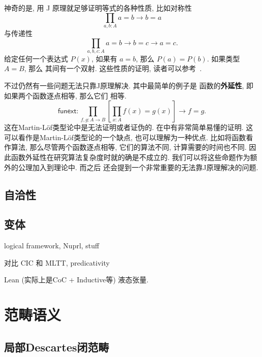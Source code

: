 \documentclass[UTF8]{ctexbook}
\newcommand{\cons}[1]{\textsf{#1}}
\theoremstyle{plain}
\theoremstyle{definition}
\theoremstyle{remark}
\begin{document}
神奇的是, 用 J 原理就足够证明等式的各种性质, 比如对称性
\[\prod_{a,b:A} a = b \to b = a\]
与传递性
\[\prod_{a,b,c:A} a=b \to b=c \to a=c.\]
给定任何一个表达式 \(P(x)\), 如果有 \(a=b\),
那么 \(P(a) = P(b)\). 如果类型 \(A = B\), 那么
其间有一个双射. 这些性质的证明, 读者可以参考~\cite[\S1.12]{ufp:2013:hottbook}.

不过仍然有一些问题无法只靠J原理解决. 其中最简单的例子是
函数的\textbf{外延性}, 即如果两个函数逐点相等, 那么它们
相等.
\[\cons{funext} : \prod_{f,g : A \to B}
\left[\prod_{x : A} f(x) = g(x)\right] \to f = g.\]
这在Martin-L\"of类型论中是无法证明或者证伪的.
在\cite{boulier:2017:syntacticmodel}中有非常简单易懂的证明.
这可以看作是Martin-L\"of类型论的一个缺点, 也可以理解为一种优点.
比如将函数看作算法, 那么尽管两个函数逐点相等, 它们的算法不同,
计算需要的时间也不同. 因此函数外延性在研究算法复杂度时就的确是不成立的.
我们可以将这些命题作为额外的公理加入到理论中. 而之后
还会提到一个非常重要的无法靠J原理解决的问题.

\section{自洽性}




\section{变体}

logical framework, Nuprl, stuff

对比 CIC 和 MLTT, predicativity

Lean (实际上是CoC + Inductive等)
液态张量.\cite{scholze:2020:liquid}

\chapter{范畴语义}

\section{局部Descartes闭范畴}
\end{document}
